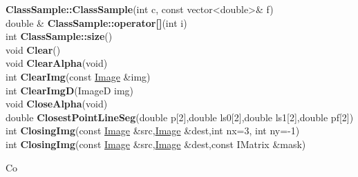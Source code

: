 \documentclass[10pt,titlepage]{article}
\def\functionlistentry#1#2#3#4#5#6{\noindent #1 {\bf #2}(#3) \dotfill #6\\}
\def\letterref#1{}
\def\letterlabel#1{\vspace{0.5cm}\centerline{\Large #1}}
\begin{document}
{{\functionlistentry{}{ClassSample::ClassSample}{int c, const vector\textless {}double\textgreater  \& f}{939}{classification}{}
\functionlistentry{double \&}{ClassSample::operator[]}{int i}{940}{classification}{}
\functionlistentry{int}{ClassSample::size}{}{941}{classification}{}
\functionlistentry{void}{Clear}{}{237}{datastructures}{}
\functionlistentry{void}{ClearAlpha}{void}{1421}{genericTools}{}
\functionlistentry{int}{ClearImg}{const \hyperlink{Image}{Image} \&img}{1083}{processing}{}
\functionlistentry{int}{ClearImgD}{ImageD img}{1095}{processing}{}
\functionlistentry{void}{CloseAlpha}{void}{1417}{genericTools}{}
\functionlistentry{double}{ClosestPointLineSeg}{double p[2],double ls0[2],double ls1[2],double pf[2]}{1374}{numeric}{}
\functionlistentry{int}{ClosingImg}{const \hyperlink{Image}{Image} \&src,\hyperlink{Image}{Image} \&dest,int nx=3, int ny=-1}{381}{filter}{}
\functionlistentry{int}{ClosingImg}{const \hyperlink{Image}{Image} \&src,\hyperlink{Image}{Image} \&dest,const IMatrix \&mask}{382}{filter}{}

\letterlabel{Co}
\letterref{A}
\letterref{B}
\letterref{C}
\letterref{D}
\letterref{E}
\letterref{F}
\letterref{G}
\letterref{H}
\letterref{I}
\letterref{K}
\letterref{L}
\letterref{M}
\letterref{N}
\letterref{O}
\letterref{P}
\letterref{Q}
\letterref{R}
\letterref{S}
\letterref{T}
\letterref{U}
\letterref{V}
\letterref{W}
\letterref{X}
\letterref{Y}
\letterref{Z}

}}
\end{document}
